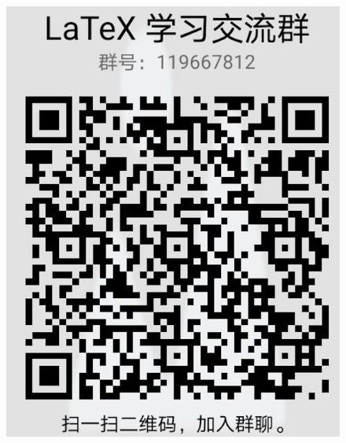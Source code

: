 \documentclass{libs/SUSTech_format}
\begin{document}

{
    \begin{frame}{}
        \centering
        \huge{\textbf{}}\\
        \vspace{1cm}
        \begin{figure}
            \includegraphics[scale=0.4]{latex_qq_group.png}
        \end{figure}
    \end{frame}
}
\end{document}
